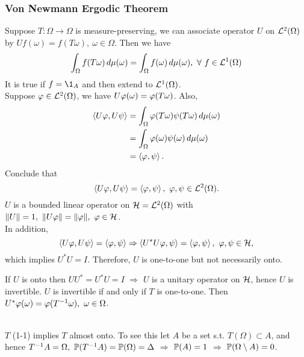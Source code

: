 \vspace{12pt}
\subsubsection{Von Newmann Ergodic Theorem}

\np Suppose $T: \Omega \to \Omega$ is measure-preserving, we can associate operator $U$ on $\Ls^2(\Omega)$ by $U f(\omega) = f(T \omega),\ \omega \in \Omega$. Then we have
\begin{equation*}
    \int_\Omega f(T \omega) \dr \mu(\omega) = \int_\Omega f(\omega) \dr \mu(\omega),\ \forall\ f \in \Ls^1(\Omega)
\end{equation*}
It is true if $f = \1_A$ and then extend to $\Ls^1(\Omega)$.\\
Suppose $\vphi \in \Ls^2(\Omega)$, we have $U \vphi(\omega) = \vphi (T \omega)$. Also,
\begin{align*}
    \inprod{U \vphi}{U \psi} &= \int_\Omega \vphi(T \omega) \psi(T \omega) \dr \mu(\omega)\\
    &= \int_\Omega \vphi(\omega) \psi(\omega) \dr \mu(\omega)\\
    &= \inprod{\vphi}{\psi}.
\end{align*}
Conclude that
\begin{equation*}
    \inprod{U \vphi}{U \psi} = \inprod{\vphi}{\psi},\ \vphi,\psi \in \Ls^2(\Omega).
\end{equation*}
$U$ is a bounded linear operator on $\Hs = \Ls^2(\Omega)$ with $\norm{U} = 1,\ \norm{U\vphi} = \norm{\vphi},\ \vphi \in \Hs$.\\
In addition,
\begin{equation*}
    \inprod{U \vphi}{U \psi} = \inprod{\vphi}{\psi} \Rightarrow \inprod{U^* U \vphi}{\psi} = \inprod{\vphi}{\psi},\ \vphi,\psi \in \Hs,
\end{equation*}
which implies $U^*U = I$. Therefore, $U$ is one-to-one but not necessarily onto.

\np If $U$ is onto then $UU^* = U^* U = I$ $\Rightarrow$ $U$ is a unitary operator on $\Hs$, hence $U$ is invertible. $U$ is invertible if and only if $T$ is one-to-one. Then $U^* \vphi(\omega) = \vphi(T^{-1} \omega),\ \omega \in \Omega$.
\begin{remark}\ \\
$T$ (1-1) implies $T$ almost onto. To see this let $A$ be a set s.t. $T(\Omega) \subset A$, and hence $T^{-1} A = \Omega,\ \P(T^{-1}A) = \P(\Omega) = \Delta$ $\Rightarrow$ $\P(A) = 1$ $\Rightarrow$ $\P(\Omega \setminus A) = 0$. 
\end{remark}

